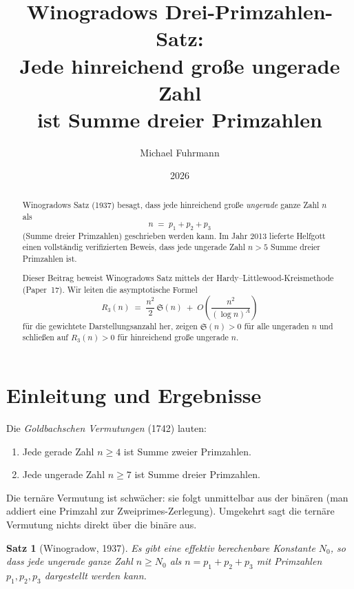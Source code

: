 \documentclass[12pt,a4paper]{amsart}
\newtheorem{theorem}{Satz}[section]
\theoremstyle{definition}
\begin{document}
\title{Winogradows Drei-Primzahlen-Satz:\\
       Jede hinreichend große ungerade Zahl\\
       ist Summe dreier Primzahlen}

\author{Michael Fuhrmann}
\address{Specialist Mathematics Project, Build 80}
\date{2026}

\begin{abstract}
Winogradows Satz (1937) besagt, dass jede hinreichend große \emph{ungerade}
ganze Zahl $n$ als
\[
  n \;=\; p_1 + p_2 + p_3
\]
(Summe dreier Primzahlen) geschrieben werden kann.  Im Jahr 2013 lieferte
Helfgott einen vollständig verifizierten Beweis, dass jede ungerade Zahl
$n > 5$ Summe dreier Primzahlen ist.

Dieser Beitrag beweist Winogradows Satz mittels der Hardy--Littlewood-Kreismethode
(Paper~17).  Wir leiten die asymptotische Formel
\[
  R_3(n) \;=\; \frac{n^2}{2}\,\mathfrak{S}(n)
               \;+\; O\!\left(\frac{n^2}{(\log n)^A}\right)
\]
für die gewichtete Darstellungsanzahl her, zeigen $\mathfrak{S}(n) > 0$
für alle ungeraden $n$ und schließen auf $R_3(n) > 0$ für hinreichend
große ungerade $n$.
\end{abstract}

\maketitle
\tableofcontents

\section{Einleitung und Ergebnisse}

Die \emph{Goldbachschen Vermutungen} (1742) lauten:
\begin{enumerate}
  \item[(Binär)] Jede gerade Zahl $n \geq 4$ ist Summe zweier Primzahlen.
  \item[(Ternär)] Jede ungerade Zahl $n \geq 7$ ist Summe dreier Primzahlen.
\end{enumerate}
Die ternäre Vermutung ist schwächer: sie folgt unmittelbar aus der binären
(man addiert eine Primzahl zur Zweiprimes-Zerlegung).  Umgekehrt sagt
die ternäre Vermutung nichts direkt über die binäre aus.

\begin{theorem}[Winogradow, 1937]\label{thm:winogradow}
  Es gibt eine effektiv berechenbare Konstante $N_0$, so dass jede ungerade
  ganze Zahl $n \geq N_0$ als $n = p_1 + p_2 + p_3$ mit Primzahlen
  $p_1, p_2, p_3$ dargestellt werden kann.
\end{theorem}
\end{document}
